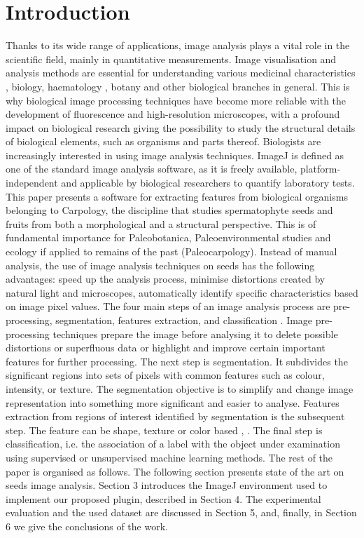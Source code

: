 \documentclass{svjour3}                     %
\begin{document}

\section{Introduction}
Thanks to its wide range of applications, image analysis plays a vital role in the scientific field, mainly in quantitative measurements. Image visualisation and analysis methods are essential for understanding various medicinal characteristics \cite{Dirub_2015}, biology, haematology \cite{Dirub_2020}, botany and other biological branches in general. This is why biological image processing techniques have become more reliable with the development of fluorescence and high-resolution microscopes, with a profound impact on biological research giving the possibility to study the structural details of biological elements, such as organisms and parts thereof.
Biologists are increasingly interested in using image analysis techniques. ImageJ \cite{ImageJ} is defined as one of the standard image analysis software, as it is freely available, platform-independent and applicable by biological researchers to quantify laboratory tests. This paper presents a software for extracting features from biological organisms belonging to Carpology, the discipline that studies spermatophyte seeds and fruits from both a morphological and a structural perspective. This is of fundamental importance for Paleobotanica, Paleoenvironmental studies and ecology if applied to remains of the past (Paleocarpology).
Instead of manual analysis, the use of image analysis techniques on seeds has the following advantages: speed up the analysis process, minimise distortions created by natural light and microscopes, automatically identify specific characteristics based on image pixel values. The four main steps of an image analysis process are pre-processing, segmentation, features extraction, and classification \cite{Gonz_2018}.
Image pre-processing techniques prepare the image before analysing it to delete possible distortions or superfluous data or highlight and improve certain important features for further processing. The next step is segmentation. It subdivides the significant regions into sets of pixels with common features such as colour, intensity, or texture. The segmentation objective is to simplify and change image representation into something more significant and easier to analyse. Features extraction from regions of interest identified by segmentation is the subsequent step. The feature can be shape, texture or color based \cite{Dirub_2015}, \cite{Dirub_2009}. The final step is classification, i.e. the association of a label with the object under examination using supervised or unsupervised machine learning methods. 
The rest of the paper is organised as follows. The following section presents state of the art on seeds image analysis. Section 3 introduces the ImageJ environment used to implement our proposed plugin, described in Section 4. The experimental evaluation and the used dataset are discussed in Section 5, and, finally, in Section 6 we give the conclusions of the work.
\end{document}
